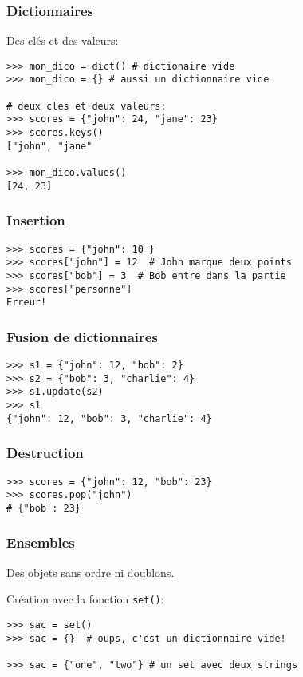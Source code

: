\documentclass{beamer}
\begin{document}
\begin{frame}[fragile]
  \frametitle{Dictionnaires}

Des clés et des valeurs:

\begin{lstlisting}
>>> mon_dico = dict() # dictionaire vide
>>> mon_dico = {} # aussi un dictionnaire vide

# deux cles et deux valeurs:
>>> scores = {"john": 24, "jane": 23}
>>> scores.keys()
["john", "jane"

>>> mon_dico.values()
[24, 23]
\end{lstlisting}

\end{frame}

\begin{frame}[fragile]
  \frametitle{Insertion}
\begin{lstlisting}
>>> scores = {"john": 10 }
>>> scores["john"] = 12  # John marque deux points
>>> scores["bob"] = 3  # Bob entre dans la partie
>>> scores["personne"]
Erreur!
\end{lstlisting}
\end{frame}

\begin{frame}[fragile]
  \frametitle{Fusion de dictionnaires}

\begin{lstlisting}
>>> s1 = {"john": 12, "bob": 2}
>>> s2 = {"bob": 3, "charlie": 4}
>>> s1.update(s2)
>>> s1
{"john": 12, "bob": 3, "charlie": 4}
\end{lstlisting}
\end{frame}


\begin{frame}[fragile]
  \frametitle{Destruction}

\begin{lstlisting}
>>> scores = {"john": 12, "bob": 23}
>>> scores.pop("john")
# {"bob': 23}
\end{lstlisting}

\end{frame}

\begin{frame}[fragile]
  \frametitle{Ensembles}
Des objets sans ordre ni doublons.

Création avec la fonction \texttt{set()}:

\begin{lstlisting}
>>> sac = set()
>>> sac = {}  # oups, c'est un dictionnaire vide!

>>> sac = {"one", "two"} # un set avec deux strings
\end{lstlisting}
\end{frame}
\end{document}
